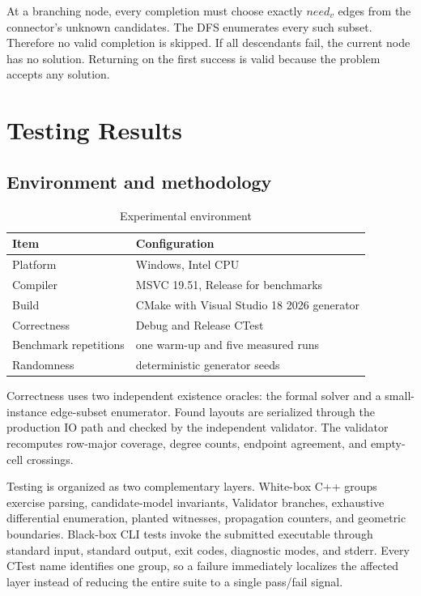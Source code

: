 \documentclass[11pt,a4paper,oneside]{article}
\begin{document}
At a branching node, every completion must choose exactly $\mathit{need}_v$
edges from the connector's unknown candidates. The DFS enumerates every such
subset. Therefore no valid completion is skipped. If all descendants fail, the
current node has no solution. Returning on the first success is valid because
the problem accepts any solution.

\section{Testing Results}

\subsection{Environment and methodology}

\begin{table}[H]
\centering
\caption{Experimental environment}
\begin{tabular}{ll}
\toprule
Item & Configuration \\
\midrule
Platform & Windows, Intel CPU \\
Compiler & MSVC 19.51, Release for benchmarks \\
Build & CMake with Visual Studio 18 2026 generator \\
Correctness & Debug and Release CTest \\
Benchmark repetitions & one warm-up and five measured runs \\
Randomness & deterministic generator seeds \\
\bottomrule
\end{tabular}
\end{table}

Correctness uses two independent existence oracles: the formal solver and a
small-instance edge-subset enumerator. Found layouts are serialized through the
production IO path and checked by the independent validator. The validator
recomputes row-major coverage, degree counts, endpoint agreement, and
empty-cell crossings.

Testing is organized as two complementary layers. White-box C++ groups exercise
parsing, candidate-model invariants, Validator branches, exhaustive differential
enumeration, planted witnesses, propagation counters, and geometric boundaries.
Black-box CLI tests invoke the submitted executable through standard input,
standard output, exit codes, diagnostic modes, and stderr. Every CTest name
identifies one group, so a failure immediately localizes the affected layer
instead of reducing the entire suite to a single pass/fail signal.
\end{document}
